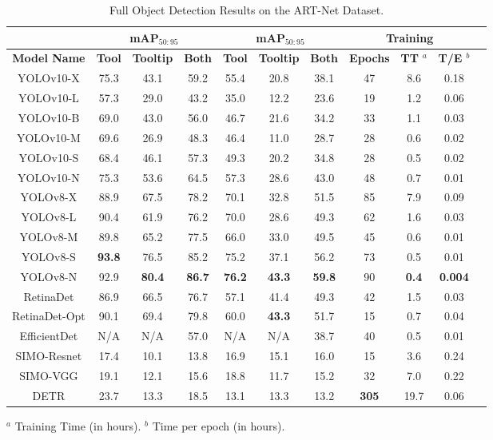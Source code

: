 \begin{table*}[h]
\centering
\caption{Full Object Detection Results on the ART-Net Dataset.}
\label{fig:artresults}
\begin{tabular}{|c|c|c|c|c|c|c|c|c|c|c|}
\hline
\multicolumn{1}{|c|}{} & \multicolumn{3}{c|}{\textbf{mAP$_{50:95}$}} & \multicolumn{3}{c|}{\textbf{mAP$_{50:95}$}} & \multicolumn{3}{c|}{\textbf{Training}} \\
\hline
\textbf{Model Name} & \textbf{Tool} & \textbf{Tooltip} & \textbf{Both} & \textbf{Tool} & \textbf{Tooltip} & \textbf{Both} & \textbf{Epochs} & \textbf{TT} $^a$ & \textbf{T/E} $^b$ \\ 
\hline
YOLOv10-X & 75.3 & 43.1 & 59.2 & 55.4 & 20.8 & 38.1 & 47 & 8.6 & 0.18 \\ 
YOLOv10-L & 57.3 & 29.0 & 43.2 & 35.0 & 12.2 & 23.6 & 19 & 1.2 & 0.06 \\ 
YOLOv10-B & 69.0 & 43.0 & 56.0 & 46.7 & 21.6 & 34.2 & 33 & 1.1 & 0.03 \\ 
YOLOv10-M & 69.6 & 26.9 & 48.3 & 46.4 & 11.0 & 28.7 & 28 & 0.6 & 0.02 \\ 
YOLOv10-S & 68.4 & 46.1 & 57.3 & 49.3 & 20.2 & 34.8 & 28 & 0.5 & 0.02 \\ 
YOLOv10-N & 75.3 & 53.6 & 64.5 & 57.3 & 28.6 & 43.0 & 48 & 0.7 & 0.01 \\ 
YOLOv8-X & 88.9 & 67.5 & 78.2 & 70.1 & 32.8 & 51.5 & 85 & 7.9 & 0.09 \\ 
YOLOv8-L & 90.4 & 61.9 & 76.2 & 70.0 & 28.6 & 49.3 & 62 & 1.6 & 0.03 \\ 
YOLOv8-M & 89.8 & 65.2 & 77.5 & 66.0 & 33.0 & 49.5 & 45 & 0.6 & 0.01 \\ 
YOLOv8-S & \textbf{93.8} & 76.5 & 85.2 & 75.2 & 37.1 & 56.2 & 73 & 0.5 & 0.01 \\ 
YOLOv8-N & 92.9 & \textbf{80.4} & \textbf{86.7} & \textbf{76.2} & \textbf{43.3} & \textbf{59.8} & 90 & \textbf{0.4} & \textbf{0.004} \\ 
RetinaDet & 86.9 & 66.5 & 76.7 & 57.1 & 41.4 & 49.3 & 42 & 1.5 & 0.03 \\ 
RetinaDet-Opt & 90.1 & 69.4 & 79.8 & 60.0 & \textbf{43.3} & 51.7 & 15 & 0.7 & 0.04 \\ 
EfficientDet & N/A & N/A & 57.0 & N/A & N/A & 38.7 & 40 & 0.5 & 0.01 \\ 
SIMO-Resnet & 17.4 & 10.1 & 13.8 & 16.9 & 15.1 & 16.0 & 15 & 3.6 & 0.24 \\ 
SIMO-VGG & 19.1 & 12.1 & 15.6 & 18.8 & 11.7 & 15.2 & 32 & 7.0 & 0.22 \\ 
DETR & 23.7 & 13.3 & 18.5 & 13.1 & 13.3 & 13.2 & \textbf{305} & 19.7 & 0.06 \\ 
\hline
\end{tabular}
\newline
\footnotesize{$^a$ Training Time (in hours). $^b$ Time per epoch (in hours).}
\end{table*}


